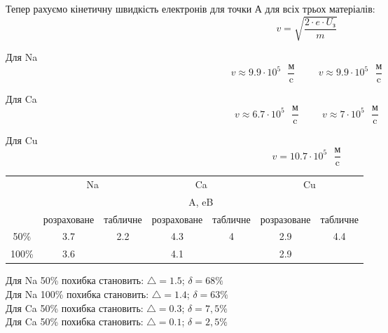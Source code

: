 \documentclass[a4paper,14pt]{extreport}
\begin{document}
	Тепер рахуємо кінетичну швидкість електронів для точки А для всіх трьох матеріалів:
	\begin{equation}
		v = \sqrt{ \dfrac{2\cdot e\cdot U_{\text{з}}}{m} }
	\end{equation}



	Для Na
		$$v  \approx 9.9\cdot 10^{5} \text{ }\dfrac{\text{м}}{\text{c}} \hspace{1cm}v \approx 9.9 \cdot 10^{5}  \text{ }\dfrac{\text{м}}{\text{c}}$$
	

	Для Ca
		$$v\approx6.7 \cdot 10^{5}  \text{ }\dfrac{\text{м}}{\text{c}} \hspace{1cm} v\approx 7 \cdot 10^{5}  \text{ }\dfrac{\text{м}}{\text{c}}$$
	

	Для Cu
		$$v =  10.7\cdot 10^{5} \text{ }\dfrac{\text{м}}{\text{c}} $$
	
	


\begin{table}[h]
	\begin{center}
		\begin{small}
			\begin{tabular}{|l|c|c|c|c|c|c|}
			\hline
			\multirow{3}{*}{} & \multicolumn{2}{c|}{Na} & \multicolumn{2}{c|}{Ca} & \multicolumn{2}{c|}{Cu} \\ \cline{2-7} 
			 & \multicolumn{6}{c|}{A, eB} \\ \cline{2-7} 
			 & розраховане & табличне & розраховане & табличне & розразоване & табличне \\ \hline
			\multicolumn{1}{|c|}{50\%} & 3.7 & \multirow{2}{*}{2.2} & 4.3 & \multirow{2}{*}{4} & 2.9 & \multirow{2}{*}{4.4} \\ \cline{1-2} \cline{4-4} \cline{6-6}
			\multicolumn{1}{|c|}{100\%} & 3.6 &  & 4.1 &  & 2.9 &  \\ \hline
			\end{tabular}
		\end{small}
	\end{center}
\end{table}

	Для Na 50\% похибка становить: $\triangle = 1.5$; $\delta = 68\%$\\
	Для Na 100\% похибка становить: $\triangle = 1.4$; $\delta = 63\%$\\

	Для Ca 50\% похибка становить: $\triangle = 0.3$; $\delta = 7,5\%$\\
	Для Ca 50\% похибка становить: $\triangle = 0.1$; $\delta = 2,5\%$\\
\end{document}
